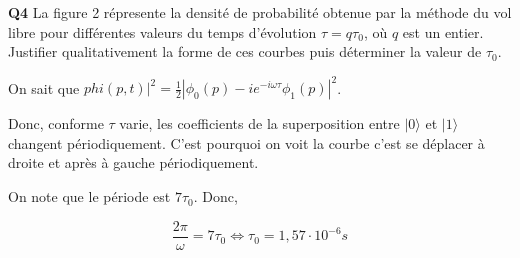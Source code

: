 \documentclass[french]{article}
\begin{document}
	\begin{tcolorbox}[colback=gray!5!white,colframe=gray!75!black]
		\textbf{\large{Q4}} La figure 2 répresente la densité de probabilité obtenue par la méthode du vol libre pour différentes valeurs du temps d'évolution $\tau = q \tau_0$, où $q$ est un entier. Justifier qualitativement la forme de ces courbes puis déterminer la valeur de $\tau_0$.
	\end{tcolorbox}

	On sait que $phi(p, t)|^2 = \frac{1}{2}\left|\phi_0(p) - ie^{-i\omega\tau}\phi_1(p)\right|^2$.
	
	Donc, conforme $\tau$ varie, les coefficients de la superposition entre $|0\rangle$ et $|1\rangle$ changent périodiquement. C'est pourquoi on voit la courbe c'est se déplacer à droite et après à gauche périodiquement.
	
	On note que le période est $7\tau_0$. Donc,
	
	\[\frac{2\pi}{\omega} = 7\tau_0 \iff \tau_0 = 1,57 \cdot 10^{-6}s\] 
	
\end{document}
